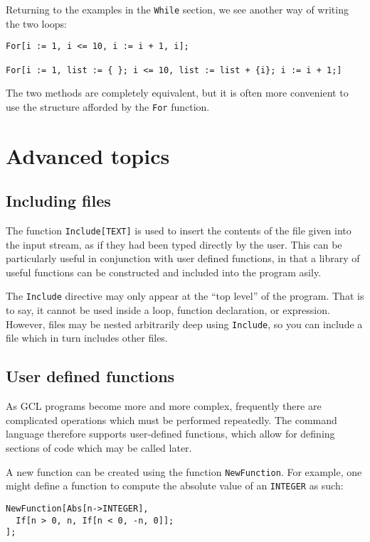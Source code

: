 Returning to the examples in the \verb+While+ section, we see another
way of writing the two loops:

\begin{verbatim}
For[i := 1, i <= 10, i := i + 1, i];

For[i := 1, list := { }; i <= 10, list := list + {i}; i := i + 1;]
\end{verbatim}

\noindent The two methods are completely equivalent, but it is often
more convenient to use the structure afforded by the \verb+For+
function.


\section{Advanced topics}

\subsection{Including files}

The function {\tt Include[TEXT]} is used to insert the contents of the
file given into the input stream, as if they had been typed directly
by the user.  This can be particularly useful in conjunction with user
defined functions, in that a library of useful functions can be
constructed and included into the program asily.

The {\tt Include} directive may only appear at the ``top level'' of
the program.  That is to say, it cannot be used inside a loop,
function declaration, or expression.  However, files may be nested
arbitrarily deep using {\tt Include}, so you can include a file which
in turn includes other files.
  
\subsection{User defined functions}

As GCL programs become more and more complex, frequently there are
complicated operations which must be performed repeatedly.  The
command language therefore supports user-defined functions, which
allow for defining sections of code which may be called later.

A new function can be created using the function \verb+NewFunction+.
For example, one might define a function to compute the absolute value
of an {\tt INTEGER} as such:

\begin{verbatim}
NewFunction[Abs[n->INTEGER],
  If[n > 0, n, If[n < 0, -n, 0]];
];
\end{verbatim}

